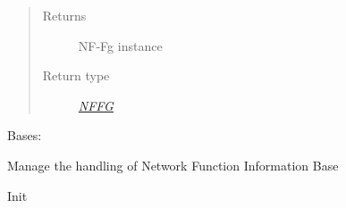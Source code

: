 \documentclass[letterpaper,10pt,english]{sphinxmanual}
\begin{document}
\begin{fulllineitems}
\begin{fulllineitems}
\begin{quote}
\begin{description}
\item[{Returns}] \leavevmode
NF-Fg instance

\item[{Return type}] \leavevmode
{\hyperref[util/nffg:escape.util.nffg.NFFG]{\emph{NFFG}}}

\end{description}\end{quote}

\end{fulllineitems}


\end{fulllineitems}


\begin{fulllineitems}
\label{orchest/ros_orchestration:escape.orchest.ros_orchestration.NFIBManager}
Bases: \href{https://docs.python.org/2.7/library/functions.html\#object}{}

Manage the handling of Network Function Information Base

\begin{fulllineitems}
\label{orchest/ros_orchestration:escape.orchest.ros_orchestration.NFIBManager.__init__}
Init

\end{fulllineitems}


\begin{fulllineitems}
\label{orchest/ros_orchestration:escape.orchest.ros_orchestration.NFIBManager.add}
\end{fulllineitems}


\begin{fulllineitems}
\label{orchest/ros_orchestration:escape.orchest.ros_orchestration.NFIBManager.remove}
\end{fulllineitems}


\begin{fulllineitems}
\label{orchest/ros_orchestration:escape.orchest.ros_orchestration.NFIBManager.getNF}
\end{fulllineitems}


\end{fulllineitems}
\end{document}
